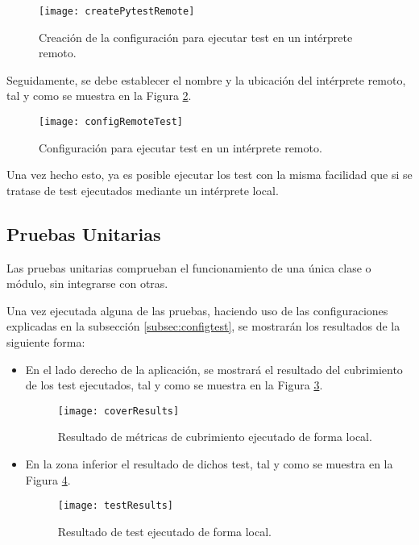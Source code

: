 \begin{figure}
	\centering
	\texttt{[image: createPytestRemote]}
	\caption[Creación de configuración de test de ejecución remota]{Creación de la configuración para ejecutar test en un intérprete remoto.}\label{fig:createPytestRemote}
\end{figure}

Seguidamente, se debe establecer el nombre y la ubicación del intérprete remoto, tal y como se muestra en la Figura \ref{fig:configRemoteTest}.

\begin{figure}
	\centering
	\texttt{[image: configRemoteTest]}
	\caption[Configuración de test de ejecución remota]{Configuración para ejecutar test en un intérprete remoto.}\label{fig:configRemoteTest}
\end{figure}

Una vez hecho esto, ya es posible ejecutar los test con la misma facilidad que si se tratase de test ejecutados mediante un intérprete local.


\subsection{Pruebas Unitarias}
Las pruebas unitarias comprueban el funcionamiento de una única clase o módulo, sin integrarse con otras. 

Una vez ejecutada alguna de las pruebas, haciendo uso de las configuraciones explicadas en la subsección \ref{subsec:configtest}, se mostrarán los resultados de la siguiente forma:

\begin{itemize}
\item En el lado derecho de la aplicación, se mostrará el resultado del cubrimiento de los test ejecutados, tal y como se muestra en la Figura \ref{fig:coverResults}. 
\begin{figure}
	\centering
	\texttt{[image: coverResults]}
	\caption[Resultado de cubrimiento de test en intérprete local]{Resultado de métricas de cubrimiento ejecutado de forma local.}\label{fig:coverResults}
\end{figure}

\item En la zona inferior el resultado de dichos test, tal y como se muestra en la Figura \ref{fig:testResults}.

\begin{figure}
	\centering
	\texttt{[image: testResults]}
	\caption[Resultado de test en intérprete local]{Resultado de test ejecutado de forma local.}\label{fig:testResults}
\end{figure}
\end{itemize}

